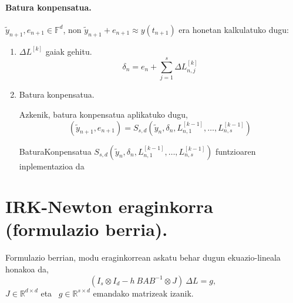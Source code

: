 \paragraph*{Batura konpensatua.}

$\tilde{y}_{n+1}, e_{n+1} \in \mathbb{F}^d$, non $\tilde{y}_{n+1}+e_{n+1}\approx y(t_{n+1})$ era honetan kalkulatuko dugu:
\begin{enumerate}

\item $\Delta L^{[k]}$ gaiak gehitu.
\begin{equation*}
\delta_{n}={e}_{n} + \sum\limits_{j=1}^{s}\Delta L_{n,j}^{[k]}
\end{equation*}

\item Batura konpensatua.

Azkenik, batura konpensatua aplikatuko dugu,
\begin{equation}
\label{eq:bkLi2}
(\tilde y_{n+1}, e_{n+1}) = S_{s,d}(\tilde y_n, \delta_n, L_{n,1}^{[k-1]}, \dots,L_{n,s}^{[k-1]})
\end{equation}
 
\begin{algorithm}[H]
  \SetAlgoLined\DontPrintSemicolon
  \caption{BaturaKonpensatua $S_{s,d}(\tilde y_n, \delta_n, L_{n,1}^{[k-1]}, \dots,L_{n,s}^{[k-1]})$ funtzioaren inplementazioa da}
\end{algorithm} 

\end{enumerate}

\section{IRK-Newton eraginkorra (formulazio berria).}
\label{sec:7.5}

Formulazio berrian, modu eraginkorrean askatu behar dugun ekuazio-lineala honakoa da, 
\begin{equation}
\label{eq:linsysZG}
(I_s \otimes I_d - h \ BAB^{-1} \otimes J) \ \Delta L = g, 
\end{equation}
$J \in \mathbb{R}^{d \times d}$  eta ~$g \in \mathbb{R}^{s \times d}$ emandako matrizeak izanik. 

